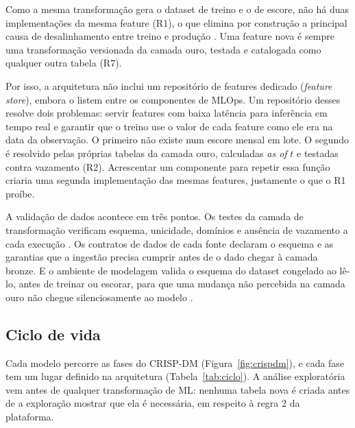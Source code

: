 Como a mesma transformação gera o dataset de treino e o de escore, não há duas implementações da mesma feature (R1), o que elimina por construção a principal causa de desalinhamento entre treino e produção \cite{polyzotis2018}. Uma feature nova é sempre uma transformação versionada da camada ouro, testada e catalogada como qualquer outra tabela (R7).

Por isso, a arquitetura não inclui um repositório de features dedicado (\textit{feature store}), embora  o listem entre os componentes de MLOps. Um repositório desses resolve dois problemas: servir features com baixa latência para inferência em tempo real e garantir que o treino use o valor de cada feature como ele era na data da observação. O primeiro não existe num escore mensal em lote. O segundo é resolvido pelas próprias tabelas da camada ouro, calculadas \textit{as of} $t$ e testadas contra vazamento (R2). Acrescentar um componente para repetir essa função criaria uma segunda implementação das mesmas features, justamente o que o R1 proíbe.

A validação de dados acontece em três pontos. Os testes da camada de transformação verificam esquema, unicidade, domínios e ausência de vazamento a cada execução \cite{schelter2018}. Os contratos de dados de cada fonte declaram o esquema e as garantias que a ingestão precisa cumprir antes de o dado chegar à camada bronze. E o ambiente de modelagem valida o esquema do dataset congelado ao lê-lo, antes de treinar ou escorar, para que uma mudança não percebida na camada ouro não chegue silenciosamente ao modelo \cite{breck2019}.

\subsection{Ciclo de vida}

Cada modelo percorre as fases do CRISP-DM \cite{wirth2000} (Figura~\ref{fig:crispdm}), e cada fase tem um lugar definido na arquitetura (Tabela~\ref{tab:ciclo}). A análise exploratória vem antes de qualquer transformação de ML: nenhuma tabela nova é criada antes de a exploração mostrar que ela é necessária, em respeito à regra 2 da plataforma.

